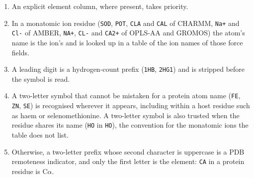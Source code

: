 \documentclass[11pt,a4paper]{article}
\begin{document}
\begin{enumerate}
  \item An explicit element column, where present, takes priority.
  \item In a monatomic ion residue (\texttt{SOD}, \texttt{POT}, \texttt{CLA} and
        \texttt{CAL} of CHARMM, \texttt{Na+} and \texttt{Cl-} of AMBER,
        \texttt{NA+}, \texttt{CL-} and \texttt{CA2+} of OPLS-AA and GROMOS) the
        atom's name is the ion's and is looked up in a table of the ion names
        of those force fields.
  \item A leading digit is a hydrogen-count prefix (\texttt{1HB},
        \texttt{2HG1}) and is stripped before the symbol is read.
  \item A two-letter symbol that cannot be mistaken for a protein atom name
        (\texttt{FE}, \texttt{ZN}, \texttt{SE}) is recognised wherever it
        appears, including within a host residue such as haem or
        selenomethionine. A two-letter symbol is also trusted when the residue
        shares its name (\texttt{HO} in \texttt{HO}), the convention for the
        monatomic ions the table does not list.
  \item Otherwise, a two-letter prefix whose second character is uppercase is a
        PDB remoteness indicator, and only the first letter is the element:
        \texttt{CA} in a protein residue is C$\alpha$.
\end{enumerate}
\end{document}
